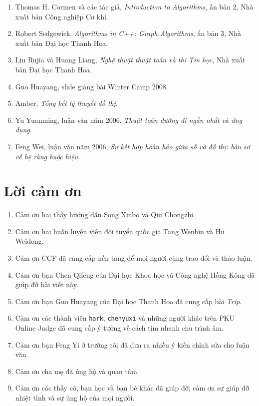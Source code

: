 \documentclass[11pt]{article}
\begin{document}
\begin{enumerate}
  \item Thomas H. Cormen và các tác giả, \textit{Introduction to Algorithms},
  ấn bản 2, Nhà xuất bản Công nghiệp Cơ khí.
  \item Robert Sedgewick, \textit{Algorithms in C++: Graph Algorithms}, ấn bản
  3, Nhà xuất bản Đại học Thanh Hoa.
  \item Liu Rujia và Huang Liang, \textit{Nghệ thuật thuật toán và thi Tin
  học}, Nhà xuất bản Đại học Thanh Hoa.
  \item Guo Huayang, slide giảng bài Winter Camp 2008.
  \item Amber, \textit{Tổng kết lý thuyết đồ thị}.
  \item Yu Yuanming, luận văn năm 2006, \textit{Thuật toán đường đi ngắn nhất
  và ứng dụng}.
  \item Feng Wei, luận văn năm 2006, \textit{Sự kết hợp hoàn hảo giữa số và
  đồ thị: bàn sơ về hệ ràng buộc hiệu}.
\end{enumerate}

\section{Lời cảm ơn}

\begin{enumerate}
  \item Cảm ơn hai thầy hướng dẫn Song Xinbo và Qiu Chongzhi.
  \item Cảm ơn hai huấn luyện viên đội tuyển quốc gia Tang Wenbin và Hu
  Weidong.
  \item Cảm ơn CCF đã cung cấp nền tảng để mọi người cùng trao đổi và thảo
  luận.
  \item Cảm ơn bạn Chen Qifeng của Đại học Khoa học và Công nghệ Hồng Kông đã
  giúp đỡ bài viết này.
  \item Cảm ơn bạn Guo Huayang của Đại học Thanh Hoa đã cung cấp bài
  \textit{Trip}.
  \item Cảm ơn các thành viên \texttt{hark}, \texttt{chenyuxi} và những người
  khác trên PKU Online Judge đã cung cấp ý tưởng về cách tìm nhanh chu trình
  âm.
  \item Cảm ơn bạn Feng Yi ở trường tôi đã đưa ra nhiều ý kiến chỉnh sửa cho
  luận văn.
  \item Cảm ơn cha mẹ đã ủng hộ và quan tâm.
  \item Cảm ơn các thầy cô, bạn học và bạn bè khác đã giúp đỡ; cảm ơn sự giúp
  đỡ nhiệt tình và sự ủng hộ của mọi người.
\end{enumerate}
\end{document}

